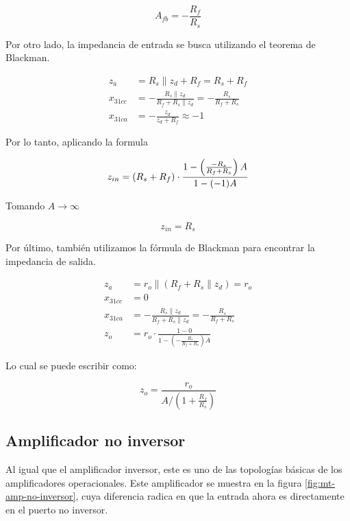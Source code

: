 \begin{equation}
    \boxed{A_{fb} = -\frac{R_f}{R_s}}
    \label{eq:mt-ganancia-amp-inversor}
\end{equation}


Por otro lado, la impedancia de entrada se busca utilizando el teorema de Blackman.

\begin{align*}
z_a &= R_s \parallel z_d + R_f = R_s + R_f \\
x_{31cc} &= -\frac{R_s \parallel z_d}{R_f + R_s \parallel z_d} = -\frac{R_s}{R_f + R_s} \\
x_{31ca} &= -\frac{z_d}{z_d + R_f} \approx -1
\end{align*}


Por lo tanto, aplicando la formula 

\begin{equation*}
z_{in} = (R_s + R_f) \cdot \frac{1 - \left( \frac{-R_s}{R_f + R_s} \right) A}{1 - (-1)A} \\
\end{equation*}

Tomando $A \rightarrow \infty$ 

\begin{equation}
    \boxed{z_{in} = R_s}
\end{equation}

Por último, también utilizamos la fórmula de Blackman para encontrar la impedancia de salida.

\begin{align*}
z_a &= r_o \parallel (R_f + R_s \parallel z_d) = r_o \\
x_{31cc} &= 0 \\
x_{31ca} &= -\frac{R_s \parallel z_d}{R_f + R_s \parallel z_d} = -\frac{R_s}{R_f + R_s} \\
z_o &= r_o \cdot \frac{1 - 0}{1 - \left( -\frac{R_s}{R_f + R_s} \right) A} 
\end{align*}

Lo cual se puede escribir como:

\begin{equation}
\boxed{z_o = \frac{r_o}{A / \left( 1 + \frac{R_f}{R_s} \right)}}
\end{equation}

\subsection{Amplificador no inversor}

Al igual que el amplificador inversor, este es uno de las topologías básicas de los amplificadores operacionales. Este amplificador se muestra en la figura \ref{fig:mt-amp-no-inversor}, cuya diferencia radica en que la entrada ahora es directamente en el puerto no inversor.

